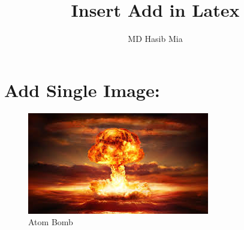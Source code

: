 \documentclass{article}
\title{Insert Add in Latex}
\author{MD Hasib Mia}
\begin{document}
	\maketitle
	\tableofcontents
	\clearpage
	
	\section{Add Single Image:}
	\begin{figure}[htp]              %
		\centering  %
		\includegraphics[width=.5\textwidth]{first.jpg}
		\caption{Atom Bomb}
	\end{figure}
	
	
	
\end{document}

